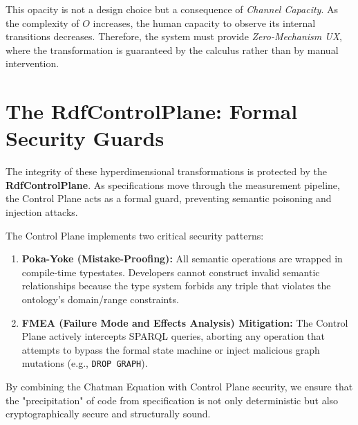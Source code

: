 This opacity is not a design choice but a consequence of \textit{Channel Capacity}. As the complexity of $O$ increases, the human capacity to observe its internal transitions decreases. Therefore, the system must provide \textit{Zero-Mechanism UX}, where the transformation is guaranteed by the calculus rather than by manual intervention.

\section{The RdfControlPlane: Formal Security Guards}

The integrity of these hyperdimensional transformations is protected by the \textbf{RdfControlPlane}. As specifications move through the measurement pipeline, the Control Plane acts as a formal guard, preventing semantic poisoning and injection attacks.

The Control Plane implements two critical security patterns:
\begin{enumerate}
    \item \textbf{Poka-Yoke (Mistake-Proofing):} All semantic operations are wrapped in compile-time typestates. Developers cannot construct invalid semantic relationships because the type system forbids any triple that violates the ontology's domain/range constraints.
    \item \textbf{FMEA (Failure Mode and Effects Analysis) Mitigation:} The Control Plane actively intercepts SPARQL queries, aborting any operation that attempts to bypass the formal state machine or inject malicious graph mutations (e.g., \texttt{DROP GRAPH}).
\end{enumerate}

By combining the Chatman Equation with Control Plane security, we ensure that the "precipitation" of code from specification is not only deterministic but also cryptographically secure and structurally sound.
